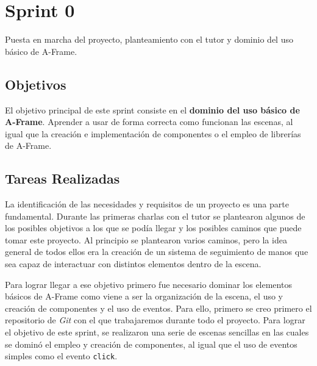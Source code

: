 \documentclass[a4paper, 12pt]{book}
\begin{document}
\section{Sprint 0}
\label{sec:sprint0}
Puesta en marcha del proyecto, planteamiento con el tutor y dominio del uso básico de A-Frame.
\subsection{Objetivos}
\label{subsec:objetivo-principal0}
El objetivo principal de este sprint consiste en el \textbf{dominio del uso básico de A-Frame}. Aprender a usar de forma correcta como funcionan las escenas, al igual que la creación e implementación de componentes o el empleo de librerías de A-Frame.

\subsection{Tareas Realizadas}
\label{subsec:implementacion0}
La identificación de las necesidades y requisitos de un proyecto es una parte fundamental. Durante las primeras charlas con el tutor se plantearon algunos de los posibles objetivos a los que se podía llegar y los posibles caminos que puede tomar este proyecto. 
Al principio se plantearon varios caminos, pero la idea general de todos ellos era la creación de un sistema de seguimiento de manos que sea capaz de interactuar con distintos elementos dentro de la escena. 

Para lograr llegar a ese objetivo primero fue necesario dominar los elementos básicos de A-Frame como viene a ser la organización de la escena, el uso y creación de componentes y el uso de eventos. 
Para ello, primero se creo primero el repositorio de \textit{Git} con el que trabajaremos durante todo el proyecto. Para lograr el objetivo de este sprint, se realizaron una serie de escenas sencillas en las cuales se dominó el empleo y creación de componentes, al igual que el uso de eventos simples como el evento \texttt{click}.
\end{document}
